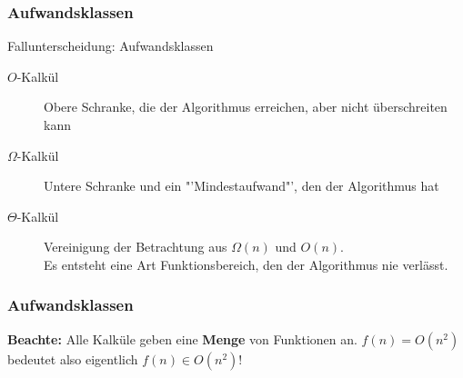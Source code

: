 \begin{frame}
			\frametitle{Aufwandsklassen}
			\begin{block}{Fallunterscheidung: Aufwandsklassen}
                \begin{description}
                    \item[$O$-Kalkül] Obere Schranke, die der Algorithmus erreichen, aber nicht überschreiten kann
                    \item[$\Omega$-Kalkül] Untere Schranke und ein "'Mindestaufwand"', den der Algorithmus hat
					\item[$\Theta$-Kalkül] Vereinigung der Betrachtung aus $\Omega(n)$ und $O(n)$.\\
						Es entsteht eine Art Funktionsbereich, den der Algorithmus nie verlässt.
                \end{description}
			\end{block}
\end{frame}

\begin{frame}
			\frametitle{Aufwandsklassen}
		\begin{block}{\bf Beachte:}
		Alle Kalküle geben eine {\bf Menge} von Funktionen an. $f(n) = O(n^2)$ bedeutet also eigentlich $f(n) \in O(n^2)$!
		\end{block}
\end{frame}

